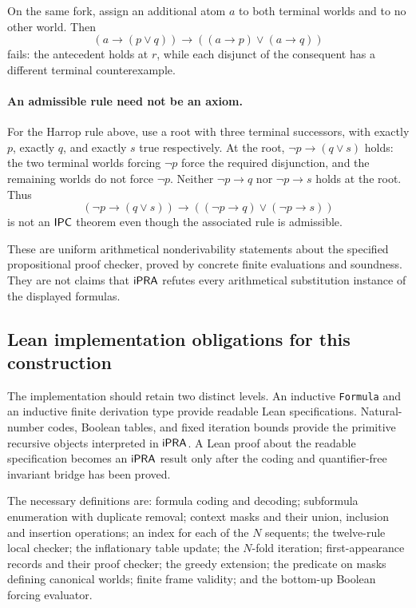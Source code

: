 On the same fork, assign an additional atom $a$ to both terminal worlds
and to no other world. Then
\[
                (a\to(p\vee q))\to
                   ((a\to p)\vee(a\to q))
\]
fails: the antecedent holds at $r$, while each disjunct of the consequent
has a different terminal counterexample.

\paragraph{An admissible rule need not be an axiom.}
For the Harrop rule above, use a root with three terminal successors, with
exactly $p$, exactly $q$, and exactly $s$ true respectively. At the root,
$\neg p\to(q\vee s)$ holds: the two terminal worlds forcing $\neg p$
force the required disjunction, and the remaining worlds do not force
$\neg p$. Neither $\neg p\to q$ nor $\neg p\to s$ holds at the root.
Thus
\[
(\neg p\to(q\vee s))\to
       ((\neg p\to q)\vee(\neg p\to s))
\]
is not an $\mathsf{IPC}$ theorem even though the associated rule is admissible.

These are uniform arithmetical nonderivability statements about the
specified propositional proof checker, proved by concrete finite
evaluations and soundness. They are not claims that $\mathsf{iPRA}$ refutes every
arithmetical substitution instance of the displayed formulas.

\subsection{Lean implementation obligations for this construction}

The implementation should retain two distinct levels. An inductive
\texttt{Formula} and an inductive finite derivation type provide readable
Lean specifications. Natural-number codes, Boolean tables, and fixed
iteration bounds provide the primitive recursive objects interpreted in
$\mathsf{iPRA}$. A Lean proof about the readable specification becomes an
$\mathsf{iPRA}$ result only after the coding and quantifier-free invariant bridge
has been proved.

The necessary definitions are: formula coding and decoding; subformula
enumeration with duplicate removal; context masks and their union,
inclusion and insertion operations; an index for each of the $N$ sequents;
the twelve-rule local checker; the inflationary table update; the
$N$-fold iteration; first-appearance records and their proof checker; the
greedy extension; the predicate on masks defining canonical worlds;
finite frame validity; and the bottom-up Boolean forcing evaluator.

